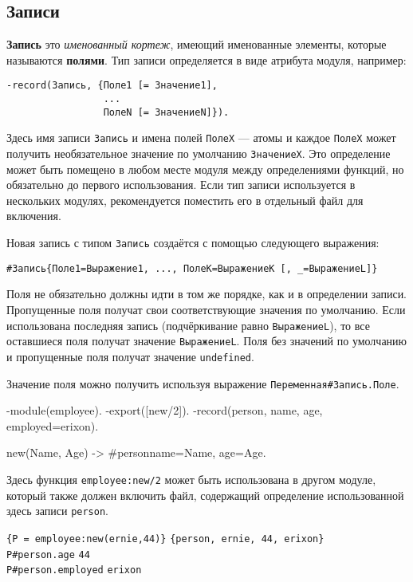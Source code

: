 \subsection{Записи}
\label{datatypes:record}

\textbf{Запись} это \textit{именованный кортеж}, имеющий именованные элементы,
которые называются \textbf{полями}. Тип записи определяется в виде атрибута 
модуля, например:

\begin{verbatim}
-record(Запись, {Поле1 [= Значение1],
                 ...
                 ПолеN [= ЗначениеN]}).
\end{verbatim}

Здесь имя записи \texttt{Запись} и имена полей \texttt{ПолеХ} --- атомы и каждое
\texttt{ПолеX} может получить необязательное значение по умолчанию
\texttt{ЗначениеX}. Это определение может быть помещено в любом месте модуля между
определениями функций, но обязательно до первого использования. Если тип записи
используется в нескольких модулях, рекомендуется поместить его в отдельный файл
для включения.

Новая запись с типом \texttt{Запись} создаётся с помощью следующего выражения:

\begin{verbatim}
#Запись{Поле1=Выражение1, ..., ПолеK=ВыражениеK [, _=ВыражениеL]}
\end{verbatim}

Поля не обязательно должны идти в том же порядке, как и в определении записи.
Пропущенные поля получат свои соответствующие значения по умолчанию. Если 
использована последняя запись (подчёркивание равно \texttt{ВыражениеL}), то все
оставшиеся поля получат значение \texttt{ВыражениеL}. Поля без значений по
умолчанию и пропущенные поля получат значение \texttt{undefined}.

Значение поля можно получить используя выражение \texttt{Переменная\#Запись.Поле}.

\begin{erlang}
-module(employee).
-export([new/2]).
-record(person, {name, age, employed=erixon}).

new(Name, Age) -> #person{name=Name, age=Age}.
\end{erlang}

Здесь функция \texttt{employee:new/2} может быть использована в другом модуле,
который также должен включить файл, содержащий определение использованной здесь
записи \texttt{person}.

\texttt{\{P = employee:new(ernie,44)\}} \resultingin \texttt{\{person, ernie, 44,
erixon\}} \\
\texttt{P\#person.age} \resultingin \texttt{44} \\
\texttt{P\#person.employed} \resultingin \texttt{erixon}

